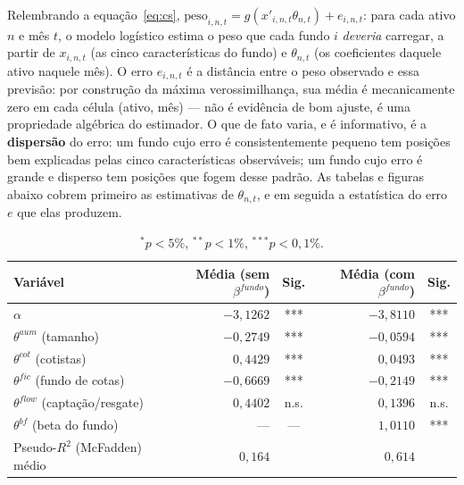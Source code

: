 \documentclass[11pt,a4paper]{article}
\begin{document}
Relembrando a equação~\eqref{eq:cs}, $\text{peso}_{i,n,t} = g(x'_{i,n,t}\theta_{n,t}) + e_{i,n,t}$:
para cada ativo $n$ e mês $t$, o modelo logístico estima o peso que cada fundo $i$
\emph{deveria} carregar, a partir de $x_{i,n,t}$ (as cinco características do fundo) e
$\theta_{n,t}$ (os coeficientes daquele ativo naquele mês). O erro $e_{i,n,t}$ é a distância
entre o peso observado e essa previsão: por construção da máxima verossimilhança, sua média é
mecanicamente zero em cada célula (ativo, mês) --- não é evidência de bom ajuste, é uma
propriedade algébrica do estimador. O que de fato varia, e é informativo, é a \textbf{dispersão}
do erro: um fundo cujo erro é consistentemente pequeno tem posições bem explicadas pelas cinco
características observáveis; um fundo cujo erro é grande e disperso tem posições que fogem
desse padrão. As tabelas e figuras abaixo cobrem primeiro as estimativas de $\theta_{n,t}$, e em
seguida a estatística do erro $e$ que elas produzem.

\begin{table}[h]\centering\small
\caption{$\Theta$ logístico: antes e depois do beta do fundo (mesma amostra, 59 meses, teste
de significância $t=\bar\theta/(\text{dp}(\theta)/\sqrt{59})$). Base: VALE3--Itaú (250 fundos,
1 ativo).}
\label{tab:theta}
\begin{tabular}{@{}lrcrc@{}}
\toprule
Variável & Média (sem $\beta^{fundo}$) & Sig. & Média (com $\beta^{fundo}$) & Sig. \\
\midrule
$\alpha$                   & $-3{,}1262$ & *** & $-3{,}8110$ & *** \\
$\theta^{aum}$ (tamanho)        & $-0{,}2749$ & *** & $-0{,}0594$ & *** \\
$\theta^{cot}$ (cotistas)       & $0{,}4429$  & *** & $0{,}0493$  & *** \\
$\theta^{fic}$ (fundo de cotas) & $-0{,}6669$ & *** & $-0{,}2149$ & *** \\
$\theta^{flow}$ (captação/resgate) & $0{,}4402$ & n.s. & $0{,}1396$ & n.s. \\
$\theta^{bf}$ (beta do fundo)   & ---          & ---& $1{,}0110$  & *** \\
\midrule
Pseudo-$R^2$ (McFadden) médio & $0{,}164$ & & $0{,}614$ & \\
\bottomrule
\end{tabular}
\caption*{\footnotesize $^{*}p<5\%$, $^{**}p<1\%$, $^{***}p<0{,}1\%$.}
\end{table}
\end{document}
